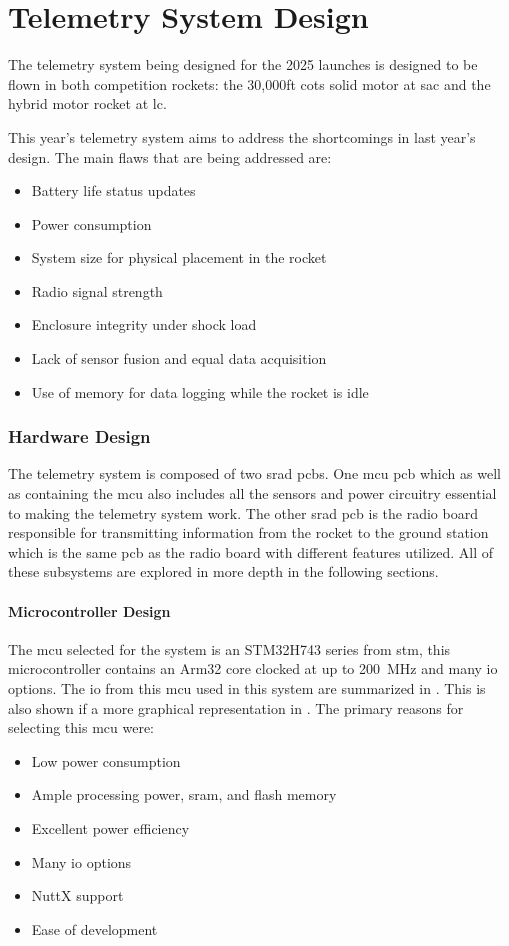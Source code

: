 \part{Telemetry System Design}

The telemetry system being designed for the 2025 launches is designed to be flown in both competition rockets: the
30,000ft \gls{cots} solid motor at \gls{sac} and the hybrid motor rocket at \gls{lc}.

This year's telemetry system aims to address the shortcomings in last year's design. The main flaws that are being
addressed are:

\begin{itemize}
    \item Battery life status updates
    \item Power consumption
    \item System size for physical placement in the rocket
    \item Radio signal strength
    \item Enclosure integrity under shock load
    \item Lack of sensor fusion and equal data acquisition
    \item Use of memory for data logging while the rocket is idle
\end{itemize}

\section{Hardware Design}
The telemetry system is composed of two \gls{srad} \gls{pcb}s. One \gls{mcu} \gls{pcb} which as well as containing the \gls{mcu} also includes all the sensors and power circuitry essential to making the telemetry system work. The other \gls{srad} \gls{pcb} is the radio board responsible for transmitting information from the rocket to the ground station which is the same \gls{pcb} as the radio board with different features utilized. All of these subsystems are explored in more depth in the following sections.


\subsection{Microcontroller Design}
The \gls{mcu} selected for the system is an STM32H743 series from \gls{stm}, this microcontroller contains an Arm32 core clocked at up to \qty{200}{\mega\hertz} and many \gls{io} options. The \gls{io} from this \gls{mcu} used in this system are summarized in . This is also shown if a more graphical representation in . The primary reasons for selecting this \gls{mcu} were: \begin{itemize}
    \item Low power consumption
    \item Ample processing power, \gls{sram}, and flash memory
    \item Excellent power efficiency
    \item Many \gls{io} options
    \item NuttX support
    \item Ease of development
\end{itemize}

